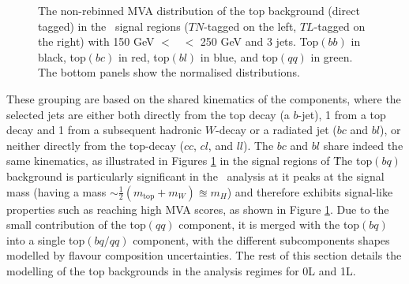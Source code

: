 \begin{figure}[!htbp]
    \centering
      \caption{The non-rebinned MVA distribution of the top background (direct tagged) in the \vhc\ signal regions ($TN$-tagged on the left, $TL$-tagged on the right) with 150 GeV $<$ \ptv\ $<$ 250 GeV and 3 jets. Top$(bb)$ in black, top$(bc)$ in red, top$(bl)$ in blue, and top$(qq)$ in green. The bottom panels show the normalised distributions.} 
      \label{fig:topflavdistr_VHcc}
\end{figure}

These grouping are based on the shared kinematics of the components, where the selected jets are either both directly from the top decay (a $b$-jet), 1 from a top decay and 1 from a subsequent hadronic $W$-decay or a radiated jet ($bc$ and $bl$), or neither directly from the top-decay ($cc$, $cl$, and $ll$). The $bc$ and $bl$ share indeed the same kinematics, as illustrated in Figures \ref{fig:topflavdistr_VHcc} in the signal regions of \vhc\. The top$(bq)$ background is particularly significant in the \vhc\ analysis at it peaks at the signal mass (having a mass $\sim \frac{1}{2} (m_{\text{top}} + m_W) \approxeq m_H$) and therefore exhibits signal-like properties such as reaching high MVA scores, as shown in Figure \ref{fig:topflavdistr_VHcc}. Due to the small contribution of the top$(qq)$ component, it is merged with the top$(bq)$ into a single top$(bq/qq)$ component, with the different subcomponents shapes modelled by flavour composition uncertainties. The rest of this section details the modelling of the top backgrounds in the analysis regimes for 0L and 1L.

